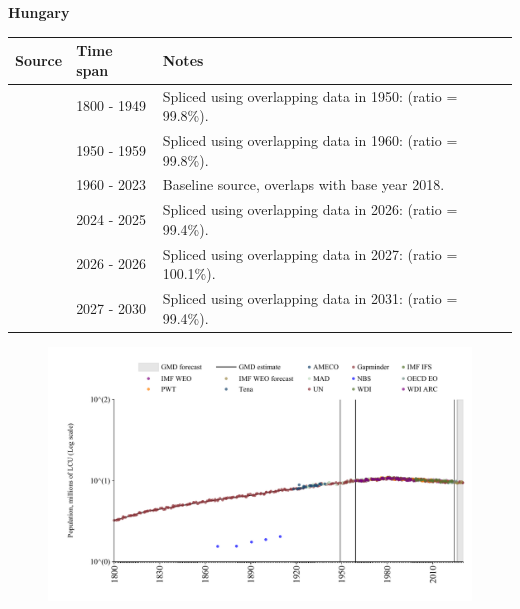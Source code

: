\documentclass[12pt,a4paper,landscape]{article}
\begin{document}
\begin{adjustbox}{max totalsize={\paperwidth}{\paperheight},center}
\begin{minipage}[t][\textheight][t]{\textwidth}
\vspace*{0.5cm}
{}
\begin{center}
{\Large\bfseries Hungary}
\end{center}
\vspace{0.5cm}
\begin{table}[H]
\centering
\small
\begin{tabular}{|l|l|l|}
\hline
\textbf{Source} & \textbf{Time span} & \textbf{Notes} \\
\hline
\rowcolor{white}\cite{Gapminder}& 1800 - 1949 &Spliced using overlapping data in 1950: (ratio = 99.8\%).\\
\rowcolor{lightgray}\cite{IMF_IFS}& 1950 - 1959 &Spliced using overlapping data in 1960: (ratio = 99.8\%).\\
\rowcolor{white}\cite{WDI}& 1960 - 2023 &Baseline source, overlaps with base year 2018.\\
\rowcolor{lightgray}\cite{OECD_EO}& 2024 - 2025 &Spliced using overlapping data in 2026: (ratio = 99.4\%).\\
\rowcolor{white}\cite{AMECO}& 2026 - 2026 &Spliced using overlapping data in 2027: (ratio = 100.1\%).\\
\rowcolor{lightgray}\cite{Gapminder}& 2027 - 2030 &Spliced using overlapping data in 2031: (ratio = 99.4\%).\\
\hline
\end{tabular}
\end{table}
\begin{figure}[H]
\centering
\includegraphics[width=\textwidth,height=0.6\textheight,keepaspectratio]{graphs/HUN_pop.pdf}
\end{figure}
\end{minipage}
\end{adjustbox}
\end{document}
